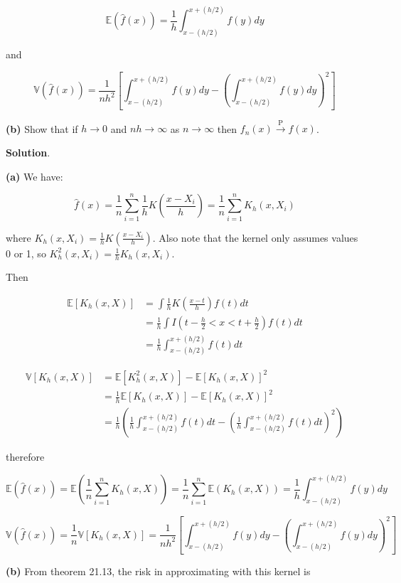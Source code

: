 \[\mathbb{E}(\hat{f}(x)) = \frac{1}{h} \int_{x-(h/2)}^{x+(h/2)} f(y) dy\]

and

\[\mathbb{V}(\hat{f}(x)) = \frac{1}{nh^2} \left[ \int_{x-(h/2)}^{x+(h/2)} f(y) dy  - \left( \int_{x-(h/2)}^{x+(h/2)} f(y) dy \right)^2\right]\]

\textbf{(b)} Show that if \(h \rightarrow 0\) and
\(nh \rightarrow \infty\) as \(n \rightarrow \infty\) then
\(f_n(x) \xrightarrow{\text{P}} f(x)\).

\textbf{Solution}.

\textbf{(a)} We have:

\[ \hat{f}(x) = \frac{1}{n} \sum_{i=1}^n \frac{1}{h} K\left( \frac{x - X_i}{h} \right) = \frac{1}{n} \sum_{i=1}^n K_h(x, X_i)\]

where \(K_h(x, X_i) = \frac{1}{h} K\left( \frac{x - X_i}{h} \right)\).
Also note that the kernel only assumes values 0 or 1, so
\(K_h^2(x, X_i) = \frac{1}{h} K_h(x, X_i)\).

Then

\[
\begin{align}
\mathbb{E}[K_h(x, X)] &= \int \frac{1}{h} K\left( \frac{x - t}{h} \right) f(t) dt \\
&= \frac{1}{h} \int I \left(t - \frac{h}{2} < x < t + \frac{h}{2} \right) f(t) dt \\
&= \frac{1}{h} \int_{x - (h/2)}^{x + (h/2)} f(t) dt
\end{align}
\]

\[
\begin{align}
\mathbb{V}[K_h(x, X)] &= \mathbb{E}[K_h^2(x, X)] - \mathbb{E}[K_h(x, X)]^2 \\
&= \frac{1}{h} \mathbb{E}[K_h(x, X)] - \mathbb{E}[K_h(x, X)]^2 \\
&= \frac{1}{h} \left(\frac{1}{h} \int_{x - (h/2)}^{x + (h/2)} f(t) dt - \left(\frac{1}{h} \int_{x - (h/2)}^{x + (h/2)} f(t) dt \right)^2 \right)
\end{align}
\]

therefore

\[\mathbb{E}(\hat{f}(x)) = \mathbb{E} \left( \frac{1}{n} \sum_{i=1}^n K_h(x, X) \right) = \frac{1}{n} \sum_{i=1}^n  \mathbb{E} \left( K_h(x, X)  \right) = \frac{1}{h} \int_{x - (h/2)}^{x + (h/2)} f(y) dy \]

\[\mathbb{V}(\hat{f}(x)) = \frac{1}{n} \mathbb{V}[K_h(x, X)] = \frac{1}{nh^2} \left[ \int_{x-(h/2)}^{x+(h/2)} f(y) dy  - \left( \int_{x-(h/2)}^{x+(h/2)} f(y) dy \right)^2\right] \]

\textbf{(b)} From theorem 21.13, the risk in approximating with this
kernel is

